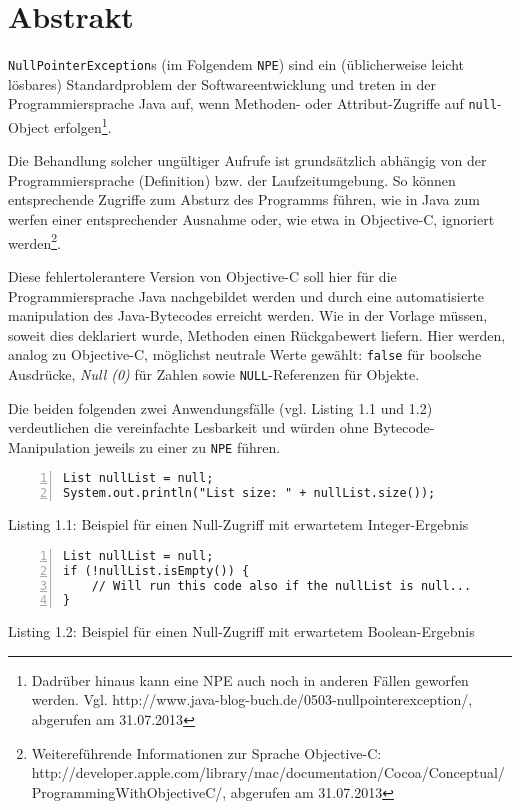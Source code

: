 
\chapter{Abstrakt}

\texttt{NullPointerException}s (im Folgendem \texttt{NPE}) sind ein (üblicherweise leicht lösbares)
Standardproblem der Softwareentwicklung und treten in der Programmiersprache Java auf,
wenn Methoden- oder Attribut-Zugriffe
auf \texttt{null}-Object erfolgen\footnote{Dadrüber hinaus kann eine NPE auch
noch in anderen Fällen geworfen werden. Vgl. http://www.java-blog-buch.de/0503-nullpointerexception/, abgerufen am 31.07.2013}.

Die Behandlung solcher ungültiger Aufrufe ist grundsätzlich abhängig von der
Programmiersprache (Definition) bzw. der Laufzeitumgebung. So können entsprechende Zugriffe
zum Absturz des Programms führen, wie in Java zum werfen einer entsprechender
Ausnahme oder, wie etwa in Objective-C, ignoriert werden\footnote{Weitereführende Informationen zur Sprache Objective-C: http://developer.apple.com/library/mac/documentation/Cocoa/Conceptual/ProgrammingWithObjectiveC/, abgerufen am 31.07.2013}.

Diese fehlertolerantere Version von Objective-C soll hier für die Programmiersprache Java
nachgebildet werden
und durch eine automatisierte manipulation des Java-Bytecodes erreicht werden.
Wie in der Vorlage müssen, soweit dies deklariert wurde, Methoden einen Rückgabewert liefern.
Hier werden, analog zu Objective-C, möglichst neutrale Werte gewählt:
\texttt{false} für boolsche Ausdrücke, \emph{Null (0)} für Zahlen sowie \texttt{NULL}-Referenzen für Objekte.

Die beiden folgenden zwei Anwendungsfälle (vgl. Listing 1.1 und 1.2) verdeutlichen
die vereinfachte Lesbarkeit und würden ohne Bytecode-Manipulation jeweils zu einer
zu \texttt{NPE} führen.

\begin{lstlisting}[basicstyle=\ttfamily,numbers=left,numberstyle=\footnotesize\ttfamily,backgroundcolor=\color{source}]
List nullList = null;
System.out.println("List size: " + nullList.size());
\end{lstlisting}
\centerline{Listing 1.1: Beispiel für einen Null-Zugriff mit erwartetem Integer-Ergebnis}

\vspace{0.3cm}

\begin{lstlisting}[basicstyle=\ttfamily,numbers=left,numberstyle=\footnotesize\ttfamily,backgroundcolor=\color{source}]
List nullList = null;
if (!nullList.isEmpty()) {
	// Will run this code also if the nullList is null...
}
\end{lstlisting}
\centerline{Listing 1.2: Beispiel für einen Null-Zugriff mit erwartetem Boolean-Ergebnis}

